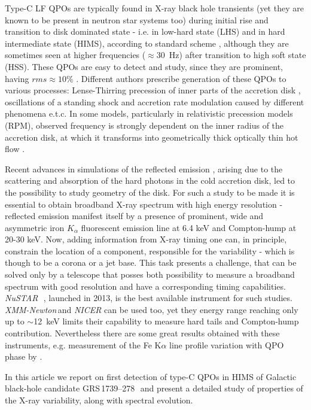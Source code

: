 \documentclass[a4paper,fleqn,usenatbib]{mnras}
\def\grs{{GRS\,1739--278\,}}
\def\xmm{{\em XMM-Newton\,}}
\def\nustar{{\em NuSTAR\,}}
\begin{document}
Type-C LF QPOs are typically found in X-ray black hole transients (yet they are known to be present in neutron star systems too) during initial rise and transition to disk dominated state - i.e. in low-hard state (LHS) and in hard intermediate state (HIMS), according to standard scheme \citep{grebenev97, tanaka96, remillard06, belloni10}, although they are sometimes seen at higher frequencies ($\approx$30~Hz) after transition to high soft state (HSS). These QPOs are easy to detect and study, since they are prominent, having $rms\approx10\%$ \citep{casella05}. 
Different authors prescribe generation of these QPOs to various processes: Lense-Thirring precession of inner parts of the accretion disk \citep{stella98, ingram09}, oscillations of a standing shock \citep{molteni96} and accretion rate modulation caused by different phenomena \citep{tagger99,cabanac10} e.t.c. 
In some models, particularly in relativistic precession models (RPM), observed frequency is strongly dependent on the inner radius of the accretion disk, at which it transforms into geometrically thick optically thin hot flow . 

Recent advances in simulations of the reflected emission \citep{ross05,garcia14}, arising due to the scattering and absorption of the hard photons in the cold accretion disk, led to the possibility to study geometry of the disk.  
For such a study to be made it is essential to obtain broadband X-ray spectrum with high energy resolution - reflected emission manifest itself by a presence of prominent, wide and asymmetric iron $K_{\alpha}$ fluorescent emission line at 6.4 keV and Compton-hump at 20-30 keV. 
Now, adding information from X-ray timing one can, in principle, constrain the location of a component, responsible for the variability - which is though to be a corona or a jet base.
This task presents a challenge, that can be solved only by a telescope that posses both possibility to measure a broadband spectrum with good resolution and have a corresponding timing capabilities. 
\nustar\, \citep{harrison13_nust}, launched in 2013, is the best available instrument for such studies. 
\xmm and {\it NICER} can be used too, yet they energy range reaching only up to $\sim$12~keV limits their capability to measure hard tails and Compton-hump contribution.
Nevertheless there are some great results obtained with these instruments, e.g. measurement of the Fe K$\alpha$ line profile variation with QPO phase by \citet[][]{ingram16}. 

In this article we report on first detection of type-C QPOs in HIMS of Galactic black-hole candidate \grs\, and present a detailed study of properties of the X-ray variability, along with spectral evolution.
\end{document}

